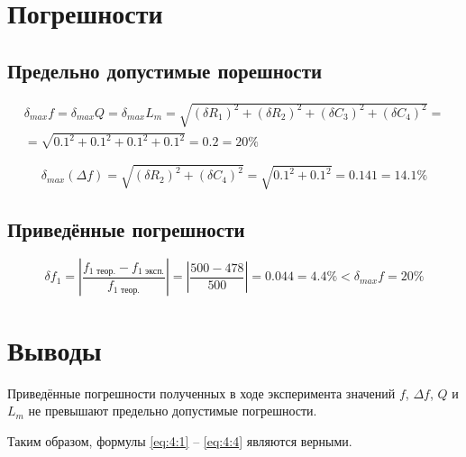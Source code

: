 \section{Погрешности}

\subsection{Предельно допустимые порешности}

\begin{displaymath}
\begin{aligned}
	\delta_{max} f = \delta_{max} Q = \delta_{max} L_m = \sqrt{(\delta R_1)^2 + (\delta R_2)^2 + (\delta C_3)^2 + (\delta C_4)^2} = \\ = \sqrt{0.1^2 + 0.1^2 + 0.1^2 + 0.1^2} = 0.2 = 20\%
\end{aligned}
\end{displaymath}

\begin{displaymath}
	\delta_{max} (\Delta f) = \sqrt{(\delta R_2)^2 + (\delta C_4)^2} = \sqrt{0.1^2 + 0.1^2} = 0.141 = 14.1\%
\end{displaymath}

\subsection{Приведённые погрешности}

\begin{displaymath}
	\delta f_1 = \left|\frac{f_\text{1 теор.} - f_\text{1 эксп.}}{f_\text{1 теор.}} \right| = \left|\frac{500 - 478}{500}\right| = 0.044 = 4.4\% < \delta_{max} f = 20\%
\end{displaymath}



\section{Выводы}

Приведённые погрешности полученных в ходе эксперимента значений $f$, $\Delta f$, $Q$ и $L_m$ не превышают предельно допустимые погрешности.

Таким образом, формулы \ref{eq:4:1} -- \ref{eq:4:4} являются верными.

